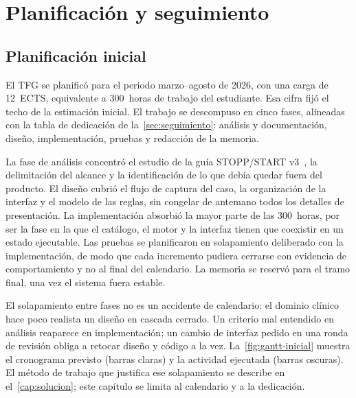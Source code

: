 
\chapter{Planificación y seguimiento}
\label{cap:planificacion}

\section{Planificación inicial}
\label{sec:plan-inicial}

El TFG se planificó para el periodo marzo--agosto de 2026, con una carga de
12~ECTS, equivalente a 300~horas de trabajo del estudiante. Esa cifra fijó
el techo de la estimación inicial. El trabajo se descompuso en cinco fases,
alineadas con la tabla de dedicación de la~\cref{sec:seguimiento}: análisis y
documentación, diseño, implementación, pruebas y redacción de la memoria.

La fase de análisis concentró el estudio de la guía STOPP/START
v3~\cite{omahony2023stopp,sacyl2023stopp}, la delimitación del alcance y la
identificación de lo que debía quedar fuera del producto. El diseño cubrió el
flujo de captura del caso, la organización de la interfaz y el modelo de las
reglas, sin congelar de antemano todos los detalles de presentación. La
implementación absorbió la mayor parte de las 300~horas, por ser la fase en
la que el catálogo, el motor y la interfaz tienen que coexistir en un estado
ejecutable. Las pruebas se planificaron en solapamiento deliberado con la
implementación, de modo que cada incremento pudiera cerrarse con evidencia
de comportamiento y no al final del calendario. La memoria se reservó para
el tramo final, una vez el sistema fuera estable.

El solapamiento entre fases no es un accidente de calendario: el dominio
clínico hace poco realista un diseño en cascada cerrado. Un criterio mal
entendido en análisis reaparece en implementación; un cambio de interfaz
pedido en una ronda de revisión obliga a retocar diseño y código a la vez.
La~\cref{fig:gantt-inicial} muestra el cronograma previsto (barras claras) y
la actividad ejecutada (barras oscuras). El método de trabajo que justifica
ese solapamiento se describe en el~\cref{cap:solucion}; este capítulo se
limita al calendario y a la dedicación.

